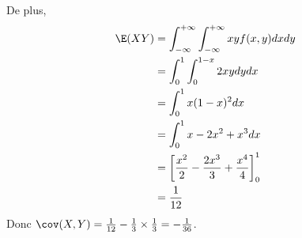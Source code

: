 {\begin{enumerate}
{			De plus, 
			\begin{align*}
				\E(XY) &= \int_{-\infty}^{+\infty} \int_{-\infty}^{+\infty} xy f(x,y) dx dy \\
				&= \int_0^1 \int_0^{1-x} 2xy dy dx \\
				&= \int_0^1 x(1-x)^2 dx \\
				&= \int_0^1 x - 2x^2 + x^3 dx \\
				&= \left[ \frac{x^2}{2} - \frac{2x^3}{3} + \frac{x^4}{4} \right]_0^1 \\
				&= \frac{1}{12}
			\end{align*}
Donc $\cov(X,Y) = \frac{1}{12} - \frac{1}{3} \times \frac{1}{3} = -\frac{1}{36}$. 
		}
	\end{enumerate}
}